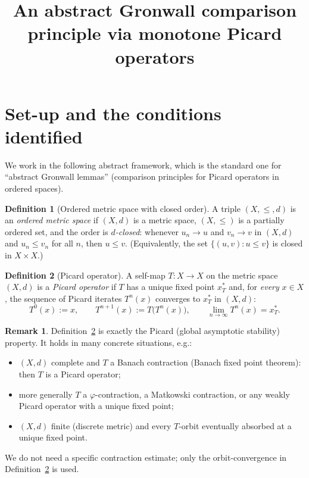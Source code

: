 \documentclass{amsart}
\theoremstyle{plain}
\theoremstyle{definition}
\newtheorem{definition}{Definition}
\newtheorem{remark}{Remark}
\begin{document}
\title{An abstract Gronwall comparison principle via monotone Picard operators}
\maketitle

\section{Set-up and the conditions identified}

We work in the following abstract framework, which is the standard one for
``abstract Gronwall lemmas'' (comparison principles for Picard operators in
ordered spaces).

\begin{definition}[Ordered metric space with closed order]\label{def:oms}
A triple $(X,\le,d)$ is an \emph{ordered metric space} if $(X,d)$ is a metric
space, $(X,\le)$ is a partially ordered set, and the order is
\emph{$d$-closed}: whenever $u_n\to u$ and $v_n\to v$ in $(X,d)$ and
$u_n\le v_n$ for all $n$, then $u\le v$. (Equivalently, the set
$\{(u,v):u\le v\}$ is closed in $X\times X$.)
\end{definition}

\begin{definition}[Picard operator]\label{def:picard}
A self-map $T:X\to X$ on the metric space $(X,d)$ is a \emph{Picard operator}
if $T$ has a unique fixed point $x^{*}_{T}$ and, for \emph{every} $x\in X$, the
sequence of Picard iterates $T^{n}(x)$ converges to $x^{*}_{T}$ in $(X,d)$:
\[
   T^{0}(x):=x,\qquad T^{n+1}(x):=T\bigl(T^{n}(x)\bigr),\qquad
   \lim_{n\to\infty}T^{n}(x)=x^{*}_{T}.
\]
\end{definition}

\begin{remark}\label{rem:examples}
Definition~\ref{def:picard} is exactly the Picard (global asymptotic
stability) property. It holds in many concrete situations, e.g.:
\begin{itemize}
\item $(X,d)$ complete and $T$ a Banach contraction (Banach fixed point
      theorem): then $T$ is a Picard operator;
\item more generally $T$ a $\varphi$-contraction, a Matkowski contraction, or
      any weakly Picard operator with a unique fixed point;
\item $(X,d)$ finite (discrete metric) and every $T$-orbit eventually
      absorbed at a unique fixed point.
\end{itemize}
We do not need a specific contraction estimate; only the orbit-convergence in
Definition~\ref{def:picard} is used.
\end{remark}
\end{document}
